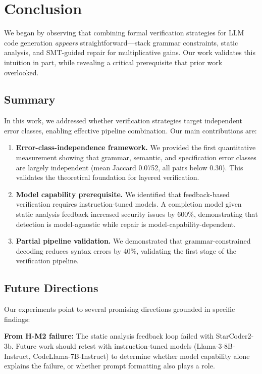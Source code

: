 \section{Conclusion}
\label{sec:conclusion}

We began by observing that combining formal verification strategies for LLM code generation \emph{appears} straightforward---stack grammar constraints, static analysis, and SMT-guided repair for multiplicative gains. Our work validates this intuition in part, while revealing a critical prerequisite that prior work overlooked.

\subsection{Summary}

In this work, we addressed whether verification strategies target independent error classes, enabling effective pipeline combination. Our main contributions are:

\begin{enumerate}
    \item \textbf{Error-class-independence framework.} We provided the first quantitative measurement showing that grammar, semantic, and specification error classes are largely independent (mean Jaccard 0.0752, all pairs below 0.30). This validates the theoretical foundation for layered verification.

    \item \textbf{Model capability prerequisite.} We identified that feedback-based verification requires instruction-tuned models. A completion model given static analysis feedback increased security issues by 600\%, demonstrating that detection is model-agnostic while repair is model-capability-dependent.

    \item \textbf{Partial pipeline validation.} We demonstrated that grammar-constrained decoding reduces syntax errors by 40\%, validating the first stage of the verification pipeline.
\end{enumerate}

\subsection{Future Directions}

Our experiments point to several promising directions grounded in specific findings:

\textbf{From H-M2 failure:} The static analysis feedback loop failed with StarCoder2-3b. Future work should retest with instruction-tuned models (Llama-3-8B-Instruct, CodeLlama-7B-Instruct) to determine whether model capability alone explains the failure, or whether prompt formatting also plays a role.

